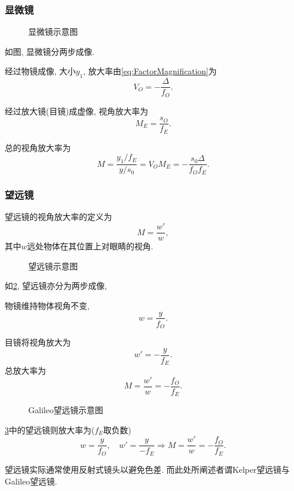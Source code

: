 \documentclass{ctexart}
\begin{document}

\subsubsection{显微镜} %
\label{ssub:显微镜}

\begin{figure}[ht]
    \centering
    \caption{显微镜示意图}
    \label{fig:显微镜示意图}
\end{figure}
如图, 显微镜分两步成像.
\begin{cenum}
    \item 经过物镜成像, 大小$y_1$, 放大率由\eqref{eq:FactorMagnification}为
    \[ V_O = -\frac{\Delta}{f_O}. \]
    \item 经过放大镜(目镜)成虚像, 视角放大率为
    \[ M_E = \frac{s_O}{f_E}. \]
    \item 总的视角放大率为
    \[ \boxed{M = \frac{y_1/f_E}{y/s_0} = V_O M_E = -\frac{s_0\Delta}{f_Of_E}.} \]
\end{cenum}


\subsubsection{望远镜} %
\label{ssub:望远镜}

望远镜的视角放大率的定义为
\[ M = \frac{w'}{w}, \]
其中$w$远处物体在其位置上对眼睛的视角.
\begin{figure}[ht]
    \centering
    \caption{望远镜示意图}
    \label{fig:望远镜示意图}
\end{figure}
如\cref{fig:望远镜示意图}, 望远镜亦分为两步成像,
\begin{cenum}
    \item 物镜维持物体视角不变,
    \[ w = \frac{y}{f_O}. \]
    \item 目镜将视角放大为
    \[ w' = -\frac{y}{f_E}. \]
    总放大率为
    \[ M = \frac{w'}{w} = -\frac{f_O}{f_E}. \]
\end{cenum}
\begin{figure}[ht]
    \centering
    \caption{Galileo望远镜示意图}
    \label{fig:Galileo望远镜示意图}
\end{figure}
\cref{fig:Galileo望远镜示意图}中的望远镜则放大率为($f_E$取负数)
\[ w = \frac{y}{f_O},\quad w' = \frac{y}{-f_E}\Rightarrow M = \frac{w'}{w} = -\frac{f_O}{f_E}. \]
\begin{remark}
    望远镜实际通常使用反射式镜头以避免色差. 而此处所阐述者谓Kelper望远镜与Galileo望远镜.
\end{remark}
\end{document}
